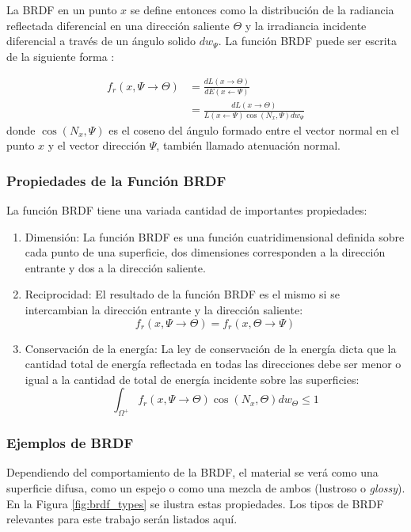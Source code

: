 La \ac{BRDF} en un punto $x$ se define entonces como la distribución de la radiancia reflectada diferencial en una dirección saliente $\Theta$ y la irradiancia incidente diferencial a través de un ángulo solido $dw_{\Psi}$. La función \ac{BRDF} puede ser escrita de la siguiente forma \cite{advanced_gi2006}:

\begin{equation}
	\begin{split}
        f_{r}(x, \Psi\to\Theta) &= \frac{dL(x\to\Theta)}{dE(x\gets\Psi)}\\
        &= \frac{dL(x\to\Theta)}{L(x\gets\Psi)\cos(N_{x}, \Psi)dw_{\Psi}}
	\end{split}
\end{equation} donde $\cos(N_{x}, \Psi)$ es el coseno del ángulo formado entre el vector normal en el punto $x$ y el vector dirección $\Psi$, también llamado atenuación normal.

\subsubsection{Propiedades de la Función BRDF}

La función BRDF tiene una variada cantidad de importantes propiedades:

\begin{enumerate}
	\item Dimensión: La función BRDF es una función cuatridimensional definida sobre cada punto de una superficie, dos dimensiones corresponden a la dirección entrante y dos a la dirección saliente.
	\item Reciprocidad: El resultado de la función BRDF es el mismo si se intercambian la dirección entrante y la dirección saliente:
    	\begin{equation}
            f_{r}(x, \Psi\to\Theta) = f_{r}(x, \Theta\to\Psi)
    	\end{equation}
	\item Conservación de la energía: La ley de conservación de la energía dicta que la cantidad total de energía reflectada en todas las direcciones debe ser menor o igual a la cantidad de total de energía incidente sobre las superficies: 
    	\begin{equation}
    		\int_{\Omega^{+}}f_{r}(x, \Psi\to\Theta)\cos(N_{x}, \Theta)dw_{\Theta} \leq 1
    	\end{equation}
\end{enumerate}

\subsubsection{Ejemplos de BRDF}
Dependiendo del comportamiento de la \ac{BRDF}, el material se verá como una superficie difusa, como un espejo o como una mezcla de ambos (lustroso o \emph{glossy}). En la Figura \ref{fig:brdf_types} se ilustra estas propiedades. Los tipos de BRDF relevantes para este trabajo serán listados aquí.


